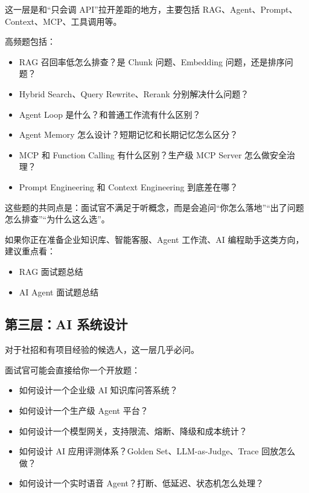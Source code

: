 \documentclass[9pt,a4paper,twocolumn]{ctexart}
\begin{document}
这一层是和“只会调 API”拉开差距的地方，主要包括 RAG、Agent、Prompt、Context、MCP、工具调用等。



高频题包括：


\begin{itemize}[itemsep=1pt, topsep=2pt]
  \item RAG 召回率低怎么排查？是 Chunk 问题、Embedding 问题，还是排序问题？
  \item Hybrid Search、Query Rewrite、Rerank 分别解决什么问题？
  \item Agent Loop 是什么？和普通工作流有什么区别？
  \item Agent Memory 怎么设计？短期记忆和长期记忆怎么区分？
  \item MCP 和 Function Calling 有什么区别？生产级 MCP Server 怎么做安全治理？
  \item Prompt Engineering 和 Context Engineering 到底差在哪？
\end{itemize}


这些题的共同点是：面试官不满足于听概念，而是会追问“你怎么落地”“出了问题怎么排查”“为什么这么选”。



如果你正在准备企业知识库、智能客服、Agent 工作流、AI 编程助手这类方向，建议重点看：


\begin{itemize}[itemsep=1pt, topsep=2pt]
  \item RAG 面试题总结
  \item AI Agent 面试题总结
\end{itemize}


\subsection*{第三层：AI 系统设计}


对于社招和有项目经验的候选人，这一层几乎必问。



面试官可能会直接给你一个开放题：


\begin{itemize}[itemsep=1pt, topsep=2pt]
  \item 如何设计一个企业级 AI 知识库问答系统？
  \item 如何设计一个生产级 Agent 平台？
  \item 如何设计一个模型网关，支持限流、熔断、降级和成本统计？
  \item 如何设计 AI 应用评测体系？Golden Set、LLM-as-Judge、Trace 回放怎么做？
  \item 如何设计一个实时语音 Agent？打断、低延迟、状态机怎么处理？
\end{itemize}
\end{document}

